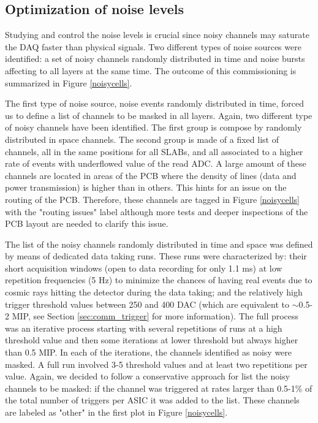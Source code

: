 \documentclass[a4paper,11pt]{article}
\begin{document}
\subsection{Optimization of noise levels}
\label{sec:comm_noise}

Studying and control the noise levels
is crucial since noisy channels may saturate the DAQ faster than physical signals.
Two different types of noise sources were identified:
a set of noisy channels randomly distributed in time 
and noise bursts affecting to all layers at the same time.
The outcome of this commissioning is summarized in Figure \ref{noisycells}.

The first type of noise source, noise events randomly distributed in time,
forced us to define a list of channels to be masked in all 
layers. Again, two different type of noisy channels have been identified. 
The first group is compose by randomly distributed in space channels.
The second group is made of
a fixed list of channels, all in the same positions for all SLABs,
and all associated to a higher rate of events with underflowed value
of the read ADC.
A large amount of these channels are located
in areas of the PCB where the density of lines 
(data and power transmission) is higher than in others.
This hints for an issue on the routing of the PCB.
Therefore, these channels are tagged in Figure \ref{noisycells} with the "routing issues" label
although more tests and deeper inspections of the PCB layout are needed to clarify this issue.

The list of the noisy channels randomly distributed in time and space was
defined by means of dedicated data taking runs. 
These runs were characterized by: their short acquisition windows (open to data recording for 
only 1.1 ms) at low repetition frequencies (5 Hz) to minimize the chances of having real events due to cosmic rays 
hitting the detector during the
data taking; and the relatively high trigger threshold values between 250 and 400 DAC 
(which are equivalent to $\sim$0.5-2 MIP, see Section \ref{sec:comm_trigger} for more 
information). The full process was an iterative process starting with several repetitions
of runs at a high threshold value and then some iterations at lower threshold but always 
higher than 0.5 MIP. 
In each of the iterations, the channels identified as noisy were masked.
A full run involved 3-5 threshold values and at least two repetitions per value.
Again, we decided to follow a conservative approach for list the noisy channels to be masked:
if the channel was triggered at rates larger than 0.5-1\% of the total number of triggers per ASIC
it was added to the list. These channels are labeled as "other" in the first plot in  Figure \ref{noisycells}.
\end{document}
